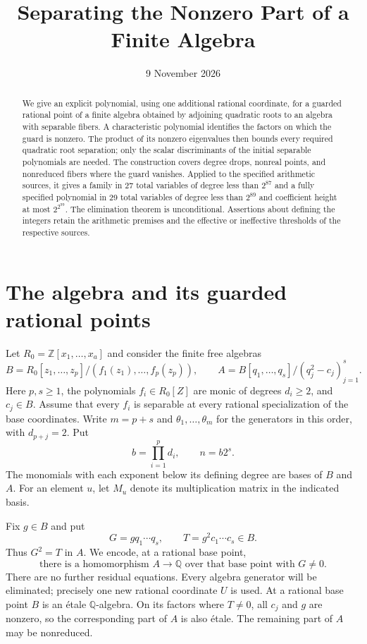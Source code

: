 \documentclass[11pt,a4paper]{article}
\title{Separating the Nonzero Part of a Finite Algebra}
\author{}\date{9 November 2026}
\newcommand{\Q}{\mathbb Q}\newcommand{\Z}{\mathbb Z}
\begin{document}
\maketitle
\begin{abstract}
We give an explicit polynomial, using one additional rational coordinate,
for a guarded rational point of a finite algebra obtained by adjoining
quadratic roots to an algebra with separable fibers. A characteristic
polynomial identifies the factors on which the guard is nonzero.
The product of its nonzero eigenvalues then bounds every required
quadratic root separation; only the scalar discriminants of the initial
separable polynomials are needed. The construction covers degree drops,
nonreal points, and nonreduced fibers where the guard vanishes.
Applied to the specified arithmetic sources, it gives a family in
27 total variables of degree less than $2^{87}$ and a fully specified
polynomial in 29 total variables of degree less than $2^{89}$ and
coefficient height at most $2^{2^{99}}$.
The elimination theorem is unconditional. Assertions about defining the
integers retain the arithmetic premises and the effective or ineffective
thresholds of the respective sources.
\end{abstract}

\section{The algebra and its guarded rational points}

Let $R_0=\Z[x_1,\ldots,x_a]$ and consider the finite free algebras
\[
 B=R_0[z_1,\ldots,z_p]/(f_1(z_1),\ldots,f_p(z_p)),\qquad
 A=B[q_1,\ldots,q_s]/(q_j^2-c_j)_{j=1}^s.
\]
Here $p,s\ge1$, the polynomials $f_i\in R_0[Z]$ are monic
of degrees $d_i\ge2$, and $c_j\in B$. Assume that every $f_i$
is separable at every rational specialization of the base coordinates.
Write $m=p+s$ and $\theta_1,\ldots,\theta_m$ for the generators
in this order, with $d_{p+j}=2$. Put
\[
 b=\prod_{i=1}^p d_i,\qquad n=b2^s.
\]
The monomials with each exponent below its defining degree are
bases of $B$ and $A$. For an element $u$, let $M_u$ denote its
multiplication matrix in the indicated basis.

Fix $g\in B$ and put
\[
 G=gq_1\cdots q_s,\qquad T=g^2c_1\cdots c_s\in B.
\]
Thus $G^2=T$ in $A$. We encode, at a rational base point,
\begin{equation}\label{eq:predicate}
 \text{there is a homomorphism } A\longrightarrow\Q
 \text{ over that base point with }G\ne0.
\end{equation}
There are no further residual equations. Every algebra generator
will be eliminated; precisely one new rational coordinate $U$ is used.
At a rational base point $B$ is an \'etale $\Q$-algebra. On
its factors where $T\ne0$, all $c_j$ and $g$ are nonzero,
so the corresponding part of $A$ is also \'etale. The remaining
part of $A$ may be nonreduced.
\end{document}
